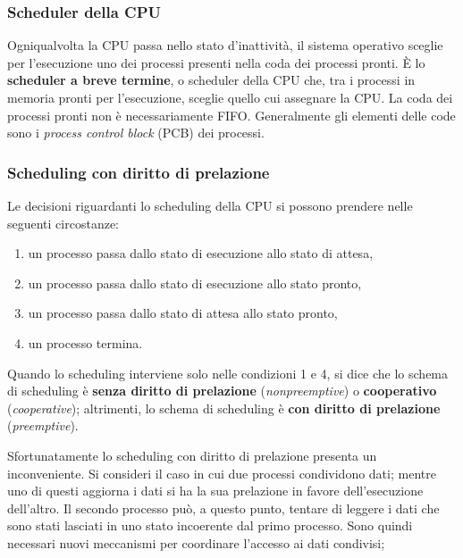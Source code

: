 \documentclass[11pt,a4paper]{article}
\begin{document}
\subsubsection{Scheduler della CPU}
Ogniqualvolta la CPU passa nello stato d'inattività, il sistema operativo sceglie per l'esecuzione uno dei processi presenti nella coda dei processi pronti. È lo \textbf{scheduler
a breve termine}, o scheduler della CPU che, tra i processi in memoria pronti per l'esecuzio­ne, sceglie quello cui assegnare la CPU.
La coda dei processi pronti non è necessariamente FIFO.
Gene­ralmente gli elementi delle code sono i \emph{process control block} (PCB) dei processi.

\subsubsection{Scheduling con diritto di prelazione}
Le decisioni riguardanti lo scheduling della CPU si possono prendere nelle seguenti circo­stanze:
\begin{enumerate}[noitemsep, leftmargin=*]
  \item un processo passa dallo stato di esecuzione allo stato di attesa,
  \item un processo passa dallo stato di esecuzione allo stato pronto,
  \item un processo passa dallo stato di attesa allo stato pronto,
  \item un processo termina.
\end{enumerate}
Quando lo scheduling interviene solo nelle condizioni 1 e 4, si dice che lo schema di
scheduling è \textbf{senza diritto di prelazione} (\emph{nonpreemptive}) o \textbf{cooperativo} (\emph{cooperative}); altri­menti, lo schema di scheduling è \textbf{con diritto di prelazione} (\emph{preemptive}).

Sfortunatamente lo scheduling con diritto di prelazione presenta un inconveniente. Si
consideri il caso in cui due processi condividono dati; mentre uno di questi aggiorna i dati
si ha la sua prelazione in favore dell'esecuzione dell'altro. Il secondo processo può, a questo
punto, tentare di leggere i dati che sono stati lasciati in uno stato incoerente dal primo pro­cesso. Sono quindi necessari nuovi meccanismi per coordinare l'accesso ai dati condivisi;
\end{document}
